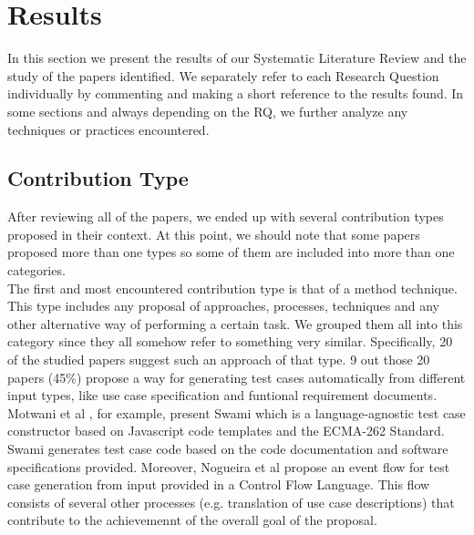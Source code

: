 \chapter*{Results}

In this section we present the results of our Systematic Literature Review and the study of the papers identified. We separately refer to 
each Research Question individually by commenting and making a short reference to the results found. In some sections and always depending on the RQ, we further analyze any 
techniques or practices encountered.

\section {Contribution Type}
After reviewing all of the papers, we ended up with several contribution types proposed in their context. At this point, we should note that some papers 
proposed more than one types so some of them are included into more than one categories. \\

The first and most encountered contribution type is that of a method technique. This type includes any proposal of approaches, processes, techniques and any 
other alternative way of performing a certain task. We grouped them all into this category since they all somehow refer to something very similar. Specifically, 20 of the
studied papers suggest such an approach of that type. 9 out those 20 papers (45\%) propose a way for generating test cases automatically from different input types, like 
use case specification and funtional requirement documents. Motwani et al \cite{8812070}, for example, present Swami which is a language-agnostic test case constructor 
based on Javascript code templates and the ECMA-262 Standard. Swami generates test case code based on the code documentation and software specifications provided. Moreover, 
Nogueira et al \cite{nogueira2015automatic} propose an event flow for test case generation from input provided in a Control Flow Language. This flow consists of several other 
processes (e.g. translation of use case descriptions) that contribute to the achievemennt of the overall goal of the proposal. \\

